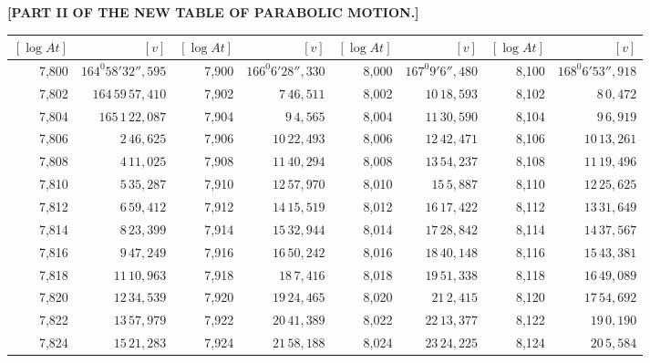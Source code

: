 \clearpage
{}
\begingroup
\centering
\fontsize{9}{9}\selectfont
\setlength{\tabcolsep}{.2pt}
\renewcommand{\arraystretch}{.9}
\setlength{\parskip}{0pt}
\textbf{[PART II OF THE NEW TABLE OF PARABOLIC MOTION.]}
\par\vspace{7pt}
\begin{tabular}{|r|r||r|r||r|r||r|r|}
\hline
\([\log At]\) & \([v]\) & \([\log At]\) & \([v]\) & \([\log At]\) & \([v]\) & \([\log At]\) & \([v]\) \\
\hline
7,800 & \(164^{0}58'32'',\!595\) & 7,900 & \(166^{0}6'28'',\!330\) & 8,000 & \(167^{0}9'6'',\!480\) & 8,100 & \(168^{0}6'53'',\!918\) \\[1pt]
7,802 & \(164\,59\,57,\!410\) & 7,902 & \(7\,46,\!511\) & 8,002 & \(10\,18,\!593\) & 8,102 & \(8\,0,\!472\) \\
7,804 & \(165\,1\,22,\!087\) & 7,904 & \(9\,4,\!565\) & 8,004 & \(11\,30,\!590\) & 8,104 & \(9\,6,\!919\) \\
7,806 & \(2\,46,\!625\) & 7,906 & \(10\,22,\!493\) & 8,006 & \(12\,42,\!471\) & 8,106 & \(10\,13,\!261\) \\
7,808 & \(4\,11,\!025\) & 7,908 & \(11\,40,\!294\) & 8,008 & \(13\,54,\!237\) & 8,108 & \(11\,19,\!496\) \\
7,810 & \(5\,35,\!287\) & 7,910 & \(12\,57,\!970\) & 8,010 & \(15\,5,\!887\) & 8,110 & \(12\,25,\!625\) \\[1pt]
7,812 & \(6\,59,\!412\) & 7,912 & \(14\,15,\!519\) & 8,012 & \(16\,17,\!422\) & 8,112 & \(13\,31,\!649\) \\
7,814 & \(8\,23,\!399\) & 7,914 & \(15\,32,\!944\) & 8,014 & \(17\,28,\!842\) & 8,114 & \(14\,37,\!567\) \\
7,816 & \(9\,47,\!249\) & 7,916 & \(16\,50,\!242\) & 8,016 & \(18\,40,\!148\) & 8,116 & \(15\,43,\!381\) \\
7,818 & \(11\,10,\!963\) & 7,918 & \(18\,7,\!416\) & 8,018 & \(19\,51,\!338\) & 8,118 & \(16\,49,\!089\) \\
7,820 & \(12\,34,\!539\) & 7,920 & \(19\,24,\!465\) & 8,020 & \(21\,2,\!415\) & 8,120 & \(17\,54,\!692\) \\[1pt]
7,822 & \(13\,57,\!979\) & 7,922 & \(20\,41,\!389\) & 8,022 & \(22\,13,\!377\) & 8,122 & \(19\,0,\!190\) \\
7,824 & \(15\,21,\!283\) & 7,924 & \(21\,58,\!188\) & 8,024 & \(23\,24,\!225\) & 8,124 & \(20\,5,\!584\) \\

\end{tabular}
